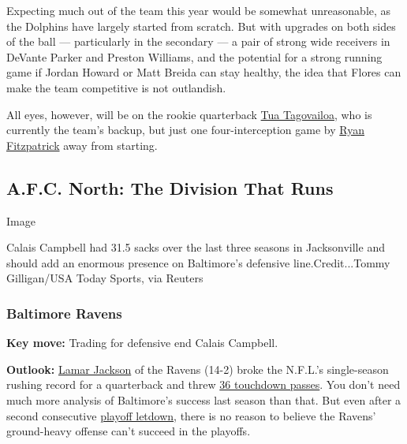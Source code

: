 Expecting much out of the team this year would be somewhat unreasonable,
as the Dolphins have largely started from scratch. But with upgrades on
both sides of the ball --- particularly in the secondary --- a pair of
strong wide receivers in DeVante Parker and Preston Williams, and the
potential for a strong running game if Jordan Howard or Matt Breida can
stay healthy, the idea that Flores can make the team competitive is not
outlandish.

All eyes, however, will be on the rookie quarterback
\href{https://www.nytimes3xbfgragh.onion/article/tua-tagovailoa.html}{Tua
Tagovailoa}, who is currently the team's backup, but just one
four-interception game by
\href{https://www.nytimes3xbfgragh.onion/2020/08/31/sports/football/nfl-quarterback-controversies.html}{Ryan
Fitzpatrick} away from starting.

\hypertarget{afc-north-the-division-that-runs}{%
\subsection{A.F.C. North: The Division That
Runs}\label{afc-north-the-division-that-runs}}

Image

Calais Campbell had 31.5 sacks over the last three seasons in
Jacksonville and should add an enormous presence on Baltimore's
defensive line.Credit...Tommy Gilligan/USA Today Sports, via Reuters

\hypertarget{baltimore-ravens}{%
\subsubsection{\texorpdfstring{\textbf{Baltimore
Ravens}}{Baltimore Ravens}}\label{baltimore-ravens}}

\textbf{Key move:} Trading for defensive end Calais Campbell.

\textbf{Outlook:}
\href{https://www.nytimes3xbfgragh.onion/2019/10/10/sports/football/lamar-jackson-ravens.html}{Lamar
Jackson} of the Ravens (14-2) broke the N.F.L.'s single-season rushing
record for a quarterback and threw
\href{https://www.pro-football-reference.com/players/J/JackLa00.htm}{36
touchdown passes}. You don't need much more analysis of Baltimore's
success last season than that. But even after a second consecutive
\href{https://www.nytimes3xbfgragh.onion/2020/01/12/sports/football/lamar-jackson-ravens-playoffs.html}{playoff
letdown}, there is no reason to believe the Ravens' ground-heavy offense
can't succeed in the playoffs.

